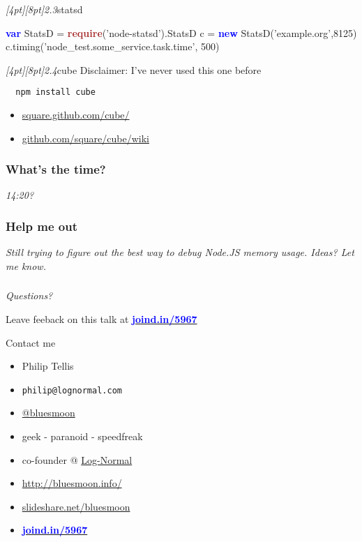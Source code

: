 \documentclass{beamer}
\newcommand{\sn}[1]{\textrm{\textit{\Huge{\raisebox{-3pt}[4pt][8pt]{\textcolor{f2elblue}{#1}}}}}\hspace{4pt}}
\newcommand{\innersplash}[1]{
  \begin{center}
    \large \textrm{\textit{ #1 } }
  \end{center}
}
\newcommand{\splashslide}[2][{}]{
  \begin{frame}
  \frametitle{#1}
  \innersplash{#2}
  \end{frame}
}
\def\brown<#1>#2{\textcolor<#1>{brown}{\textbf<#1>{#2}}}
\def\blue<#1>#2{\textcolor<#1>{blue}{\textbf<#1>{#2}}}
\begin{document}
\begin{frame}[fragile]{\sn{2.3}statsd}
\begin{semiverbatim}
\blue<1>{var} StatsD = \brown<1>{require}('node-statsd').StatsD
c = \blue<1>{new} StatsD('example.org',8125)
c.timing('node\_test.some\_service.task.time', 500)
\end{semiverbatim}
\end{frame}

\begin{frame}[fragile]{\sn{2.4}cube}
Disclaimer: I've never used this one before
\begin{verbatim}
  npm install cube
\end{verbatim}
\begin{itemize}
  \item \href{http://square.github.com/cube/}{square.github.com/cube/}
  \item \href{https://github.com/square/cube/wiki}{github.com/square/cube/wiki}
\end{itemize}
\end{frame}

\splashslide[What's the time?]{\LARGE 14:20?}

\splashslide[Help me out]{Still trying to figure out the best way to debug Node.JS memory usage. Ideas? Let me know.}

\splashslide{\LARGE Questions?}

\begin{frame}
\begin{center}

  Leave feeback on this talk at \href{https://joind.in/5967}{\blue<1>{joind.in/5967}}
\end{center}
\end{frame}

\begin{frame}{Contact me}
  \begin{itemize}
  \item Philip Tellis
  \item \small{\texttt{philip@lognormal.com}}
  \item \href{http://twitter.com/bluesmoon}{@bluesmoon}
  \item geek - paranoid - speedfreak
  \item co-founder @ \href{http://www.lognormal.com/}{Log-Normal}
  \item \href{http://bluesmoon.info/}{http://bluesmoon.info/}
  \item \href{http://www.slideshare.net/bluesmoon}{slideshare.net/bluesmoon}
  \item \href{https://joind.in/5967}{\blue<1>{joind.in/5967}}
  \end{itemize}
\end{frame}
\end{document}
